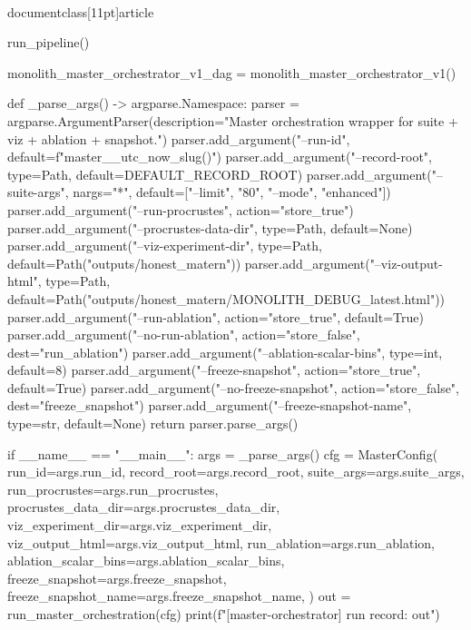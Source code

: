 \\documentclass[11pt]{article}
\begin{document}
\begin{CodeBlock}
        run_pipeline()

    monolith_master_orchestrator_v1_dag = monolith_master_orchestrator_v1()


def _parse_args() -> argparse.Namespace:
    parser = argparse.ArgumentParser(description="Master orchestration wrapper for suite + viz + ablation + snapshot.")
    parser.add_argument("--run-id", default=f"master_{_utc_now_slug()}")
    parser.add_argument("--record-root", type=Path, default=DEFAULT_RECORD_ROOT)
    parser.add_argument("--suite-args", nargs="*", default=["--limit", "80", "--mode", "enhanced"])
    parser.add_argument("--run-procrustes", action="store_true")
    parser.add_argument("--procrustes-data-dir", type=Path, default=None)
    parser.add_argument("--viz-experiment-dir", type=Path, default=Path("outputs/honest_matern"))
    parser.add_argument("--viz-output-html", type=Path, default=Path("outputs/honest_matern/MONOLITH_DEBUG_latest.html"))
    parser.add_argument("--run-ablation", action="store_true", default=True)
    parser.add_argument("--no-run-ablation", action="store_false", dest="run_ablation")
    parser.add_argument("--ablation-scalar-bins", type=int, default=8)
    parser.add_argument("--freeze-snapshot", action="store_true", default=True)
    parser.add_argument("--no-freeze-snapshot", action="store_false", dest="freeze_snapshot")
    parser.add_argument("--freeze-snapshot-name", type=str, default=None)
    return parser.parse_args()


if __name__ == "__main__":
    args = _parse_args()
    cfg = MasterConfig(
        run_id=args.run_id,
        record_root=args.record_root,
        suite_args=args.suite_args,
        run_procrustes=args.run_procrustes,
        procrustes_data_dir=args.procrustes_data_dir,
        viz_experiment_dir=args.viz_experiment_dir,
        viz_output_html=args.viz_output_html,
        run_ablation=args.run_ablation,
        ablation_scalar_bins=args.ablation_scalar_bins,
        freeze_snapshot=args.freeze_snapshot,
        freeze_snapshot_name=args.freeze_snapshot_name,
    )
    out = run_master_orchestration(cfg)
    print(f"[master-orchestrator] run record: {out}")

\end{CodeBlock}
\end{document}
